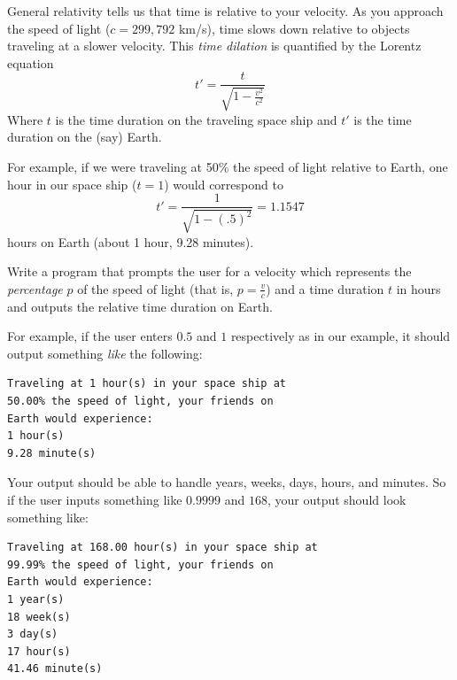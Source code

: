 \begin{exer}
General relativity tells us that time is relative to your velocity.  
As you approach the speed of light ($c = 299,792$ km/s), 
time slows down relative to objects traveling at a slower velocity.  
This \emph{time dilation} is quantified by the Lorentz equation
  $$t' = \frac{t}{\sqrt{1-\frac{v^2}{c^2}}}$$
Where $t$ is the time duration on the traveling space ship and 
$t'$ is the time duration on the (say) Earth.  
  
For example, if we were traveling at 50\% the speed of light 
relative to Earth, one hour in our space ship ($t=1$) would 
correspond to 
  $$t' = \frac{1}{\sqrt{1-(.5)^2}} = 1.1547$$
hours on Earth (about 1 hour, 9.28 minutes).

Write a program that prompts the user for a velocity which represents the
\emph{percentage} $p$ of the speed of light (that is, $p = \frac{v}{c}$) and
a time duration $t$ in hours and outputs the relative time duration on Earth.

For example, if the user enters $0.5$ and $1$ respectively as in our example, it
should output something \emph{like} the following:

\begin{verbatim}
Traveling at 1 hour(s) in your space ship at
50.00% the speed of light, your friends on
Earth would experience:
1 hour(s)
9.28 minute(s)
\end{verbatim}

Your output should be able to handle years, weeks, days, hours, and minutes.  So
if the user inputs something like $0.9999$ and $168$, your output should
look something like:

\begin{verbatim}
Traveling at 168.00 hour(s) in your space ship at
99.99% the speed of light, your friends on 
Earth would experience: 
1 year(s)
18 week(s)
3 day(s)
17 hour(s)
41.46 minute(s)
\end{verbatim}
\end{exer}

